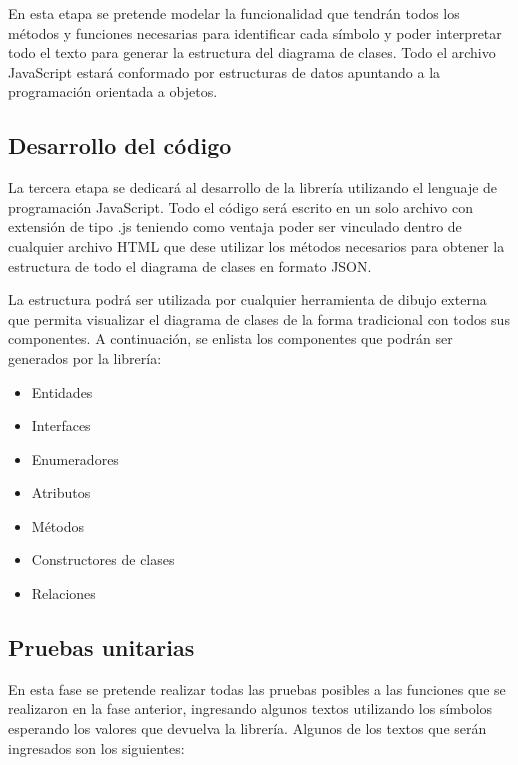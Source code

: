 \documentclass[12pt,a4paper,final, xcolor=table, table]{article}
\begin{document}
	En esta etapa se pretende modelar la funcionalidad que tendrán todos los métodos y funciones necesarias para identificar cada símbolo y poder interpretar todo el texto para generar la estructura del diagrama de clases.
	Todo el archivo JavaScript estará conformado por estructuras de datos apuntando a la programación orientada a objetos.
	
	\subsection{Desarrollo del código}
	
	La tercera etapa se dedicará al desarrollo de la librería utilizando el lenguaje de programación JavaScript. Todo el código será escrito en un solo archivo con extensión de tipo .js teniendo como ventaja poder ser vinculado dentro de cualquier archivo HTML que dese utilizar los métodos necesarios para obtener la estructura de todo el diagrama de clases en formato JSON.
	
	La estructura podrá ser utilizada por cualquier herramienta de dibujo externa que permita visualizar el diagrama de clases de la forma tradicional con todos sus componentes. A continuación, se enlista los componentes que podrán ser generados por la librería:
	
	\begin{itemize}
		\item Entidades
		\item Interfaces
		\item Enumeradores
		\item Atributos
		\item Métodos
		\item Constructores de clases
		\item Relaciones
	\end{itemize}

	\subsection{Pruebas unitarias}
	En esta fase se pretende realizar todas las pruebas posibles a las funciones que se realizaron en la fase anterior, ingresando algunos textos utilizando los símbolos esperando los valores que devuelva la librería. Algunos de los textos que serán ingresados son los siguientes:
	
\end{document}
